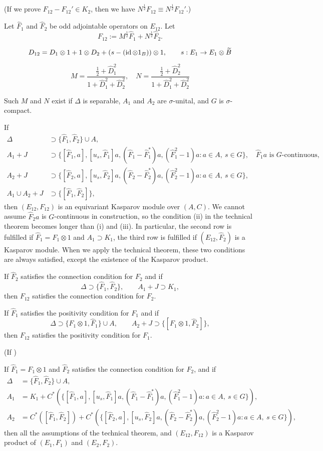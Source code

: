 \documentclass{../../large}
\begin{document}
\begin{prb}
(If we prove $F_{12}-F_{12}'\in K_2$, then we have $N^{\frac12}F_{12}\equiv N^{\frac12}F_{12}'$.)


Let $\hat F_1$ and $\hat F_2$ be odd adjointable operators on $E_{12}$.
Let
\[F_{12}:=M^{\frac12}\hat F_1+N^{\frac12}\hat F_2.\]

\[D_{12}=D_1\otimes1+1\otimes D_2+(s-(\operatorname{id}\otimes1_B))\otimes1,\qquad s:E_1\to E_1\otimes\widetilde B\]

\[M=\frac{\frac12+\hat D_1^2}{1+\hat D_1^2+\hat D_2^2},\quad N=\frac{\frac12+\hat D_2^2}{1+\hat D_1^2+\hat D_2^2}\]




\begin{parts}
\item Such $M$ and $N$ exist if $\Delta$ is separable, $A_1$ and $A_2$ are $\sigma$-unital, and $G$ is $\sigma$-compact.
\item If
\begin{align*}
\Delta&\supset\{\hat F_1,\hat F_2\}\cup A,\\
A_1+J&\supset\{[\hat F_1,a],[u_s,\hat F_1]a,(\hat F_1-\hat F_1^*)a,(\hat F_1^2-1)a:a\in A,\ s\in G\},\quad\text{$\hat F_1a$ is $G$-continuous},\\
A_2+J&\supset\{[\hat F_2,a],[u_s,\hat F_2]a,(\hat F_2-\hat F_2^*)a,(\hat F_2^2-1)a:a\in A,\ s\in G\},\\
A_1\cup A_2+J&\supset\{[\hat F_1,\hat F_2]\},
\end{align*}
then $(E_{12},F_{12})$ is an equivariant Kasparov module over $(A,C)$.
We cannot assume $\hat F_2a$ is $G$-continuous in construction, so the condition (ii) in the technical theorem becomes longer than (i) and (iii).
In particular, the second row is fulfilled if $\hat F_1=F_1\otimes1$ and $A_1\supset K_1$, the third row is fulfilled if $(E_{12},\hat F_2)$ is a Kasparov module.
When we apply the technical theorem, these two conditions are always satisfied, except the existence of the Kasparov product.
\item If $\hat F_2$ satisfies the connection condition for $F_2$ and if
\[\Delta\supset\{\hat F_1,\hat F_2\},\qquad
A_1+J\supset K_1,\]
then $F_{12}$ satisfies the connection condition for $F_2$.
\item If $\hat F_1$ satisfies the positivity condition for $F_1$ and if
\[\Delta\supset\{F_1\otimes1,\hat F_1\}\cup A,\qquad
A_2+J\supset\{[F_1\otimes1,\hat F_2]\},\]
then $F_{12}$ satisfies the positivity condition for $F_1$.

(If )
\item
If $\hat F_1=F_1\otimes1$ and $\hat F_2$ satisfies the connection condition for $F_2$, and if
\begin{align*}
\Delta&=\{\hat F_1,\hat F_2\}\cup A,\\
A_1&=K_1+C^*(\{[\hat F_1,a],[u_s,\hat F_1]a,(\hat F_1-\hat F_1^*)a,(\hat F_1^2-1)a:a\in A,\ s\in G\}),\\
A_2&=C^*([\hat F_1,\hat F_2])+C^*(\{[\hat F_2,a],[u_s,\hat F_2]a,(\hat F_2-\hat F_2^*)a,(\hat F_2^2-1)a:a\in A,\ s\in G\}),
\end{align*}
then all the assumptions of the technical theorem, and $(E_{12},F_{12})$ is a Kasparov product of $(E_1,F_1)$ and $(E_2,F_2)$.


\end{parts}
\end{prb}
\end{document}
